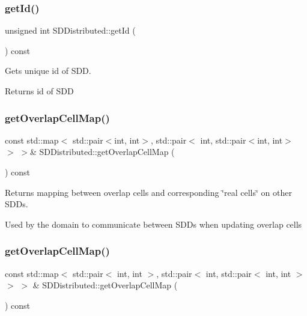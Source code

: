 \subsubsection{\texorpdfstring{get\+Id()}{getId()}\hspace{0.1cm}{\footnotesize\ttfamily [2/2]}}
{\footnotesize\ttfamily unsigned int S\+D\+Distributed\+::get\+Id (\begin{DoxyParamCaption}{ }\end{DoxyParamCaption}) const}



Gets unique id of S\+DD. 

\begin{DoxyReturn}{Returns}
id of S\+DD 
\end{DoxyReturn}
\mbox{\label{classSDDistributed_a2a2e744edad326561e3555a352ce4a0a}} 
\subsubsection{\texorpdfstring{get\+Overlap\+Cell\+Map()}{getOverlapCellMap()}\hspace{0.1cm}{\footnotesize\ttfamily [1/2]}}
{\footnotesize\ttfamily const std\+::map$<$ std\+::pair$<$int, int$>$, std\+::pair$<$ int, std\+::pair$<$int, int$>$ $>$ $>$\& S\+D\+Distributed\+::get\+Overlap\+Cell\+Map (\begin{DoxyParamCaption}{ }\end{DoxyParamCaption}) const}



Returns mapping between overlap cells and corresponding \char`\"{}real cells\char`\"{} on other S\+D\+Ds. 

Used by the domain to communicate between S\+D\+Ds when updating overlap cells \mbox{\label{classSDDistributed_a5ca6adae6bc3b93f937a633f8813fed0}} 
\subsubsection{\texorpdfstring{get\+Overlap\+Cell\+Map()}{getOverlapCellMap()}\hspace{0.1cm}{\footnotesize\ttfamily [2/2]}}
{\footnotesize\ttfamily const std\+::map$<$ std\+::pair$<$ int, int $>$, std\+::pair$<$ int, std\+::pair$<$ int, int $>$ $>$ $>$ \& S\+D\+Distributed\+::get\+Overlap\+Cell\+Map (\begin{DoxyParamCaption}{ }\end{DoxyParamCaption}) const}




